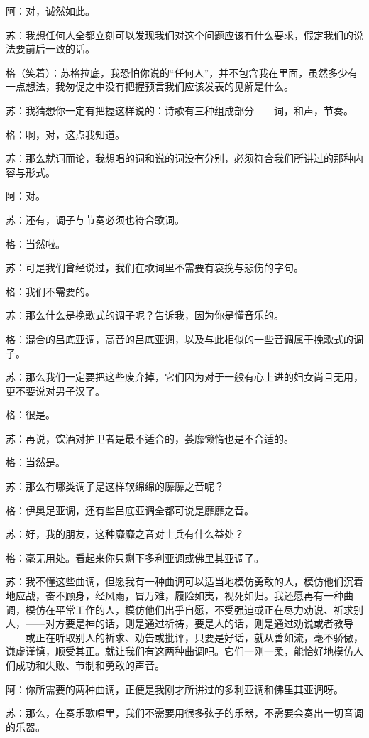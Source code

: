 \documentclass[11pt,oneside]{book}
\begin{document}
\begin{common-format}
阿：对，诚然如此。

苏：我想任何人全都立刻可以发现我们对这个问题应该有什么要求，假定我们的说法要前后一致的话。

格（笑着）：苏格拉底，我恐怕你说的“任何人”，并不包含我在里面，虽然多少有一点想法，我匆促之中没有把握预言我们应该发表的见解是什么。

苏：我猜想你一定有把握这样说的：诗歌有三种组成部分——词，和声，节奏。

格：啊，对，这点我知道。

苏：那么就词而论，我想唱的词和说的词没有分别，必须符合我们所讲过的那种内容与形式。

阿：对。

苏：还有，调子与节奏必须也符合歌词。

格：当然啦。

苏：可是我们曾经说过，我们在歌词里不需要有哀挽与悲伤的字句。

格：我们不需要的。

苏：那么什么是挽歌式的调子呢？告诉我，因为你是懂音乐的。

格：混合的吕底亚调，高音的吕底亚调，以及与此相似的一些音调属于挽歌式的调子。

苏：那么我们一定要把这些废弃掉，它们因为对于一般有心上进的妇女尚且无用，更不要说对男子汉了。

格：很是。

苏：再说，饮酒对护卫者是最不适合的，萎靡懒惰也是不合适的。

格：当然是。

苏：那么有哪类调子是这样软绵绵的靡靡之音呢？

格：伊奥足亚调，还有些吕底亚调全都可说是靡靡之音。

苏：好，我的朋友，这种靡靡之音对士兵有什么益处？

格：毫无用处。看起来你只剩下多利亚调或佛里其亚调了。

苏：我不懂这些曲调，但愿我有一种曲调可以适当地模仿勇敢的人，模仿他们沉着地应战，奋不顾身，经风雨，冒万难，履险如夷，视死如归。我还愿再有一种曲调，模仿在平常工作的人，模仿他们出乎自愿，不受强迫或正在尽力劝说、祈求别人，——对方要是神的话，则是通过祈祷，要是人的话，则是通过劝说或者教导——或正在听取别人的祈求、劝告或批评，只要是好话，就从善如流，毫不骄傲，谦虚谨慎，顺受其正。就让我们有这两种曲调吧。它们一刚一柔，能恰好地模仿人们成功和失败、节制和勇敢的声音。

阿：你所需要的两种曲调，正便是我刚才所讲过的多利亚调和佛里其亚调呀。

苏：那么，在奏乐歌唱里，我们不需要用很多弦子的乐器，不需要会奏出一切音调的乐器。


\end{common-format}
\end{document}
